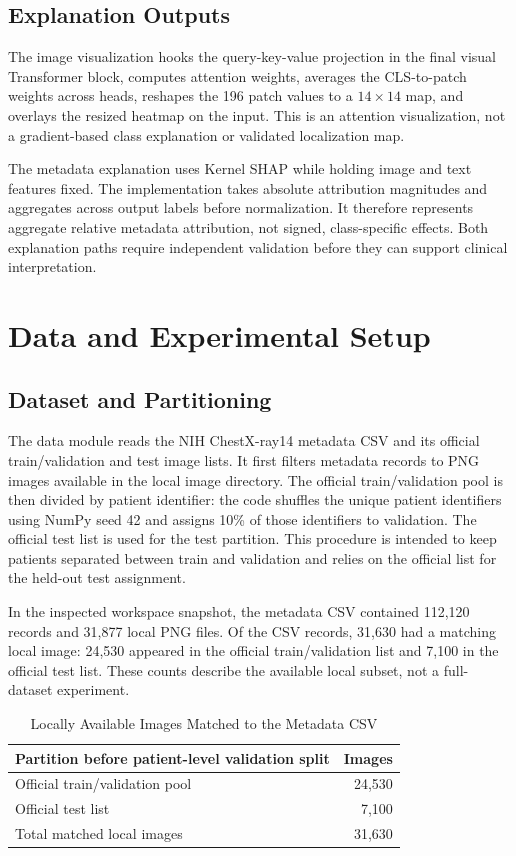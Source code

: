 \documentclass[conference]{IEEEtran}
\begin{document}
\subsection{Explanation Outputs}
The image visualization hooks the query-key-value projection in the final visual Transformer block, computes attention weights, averages the CLS-to-patch weights across heads, reshapes the 196 patch values to a $14 \times 14$ map, and overlays the resized heatmap on the input. This is an attention visualization, not a gradient-based class explanation or validated localization map.

The metadata explanation uses Kernel SHAP while holding image and text features fixed. The implementation takes absolute attribution magnitudes and aggregates across output labels before normalization. It therefore represents aggregate relative metadata attribution, not signed, class-specific effects. Both explanation paths require independent validation before they can support clinical interpretation.

\section{Data and Experimental Setup}
\subsection{Dataset and Partitioning}
The data module reads the NIH ChestX-ray14 metadata CSV and its official train/validation and test image lists. It first filters metadata records to PNG images available in the local image directory. The official train/validation pool is then divided by patient identifier: the code shuffles the unique patient identifiers using NumPy seed 42 and assigns 10\% of those identifiers to validation. The official test list is used for the test partition. This procedure is intended to keep patients separated between train and validation and relies on the official list for the held-out test assignment.

In the inspected workspace snapshot, the metadata CSV contained 112,120 records and 31,877 local PNG files. Of the CSV records, 31,630 had a matching local image: 24,530 appeared in the official train/validation list and 7,100 in the official test list. These counts describe the available local subset, not a full-dataset experiment.

\begin{table}[t]
\caption{Locally Available Images Matched to the Metadata CSV}
\label{tab:localdata}
\centering
\scriptsize
\begin{tabular}{lr}
\toprule
Partition before patient-level validation split & Images \\
\midrule
Official train/validation pool & 24,530 \\
Official test list & 7,100 \\
\midrule
Total matched local images & 31,630 \\
\bottomrule
\end{tabular}
\end{table}
\end{document}
